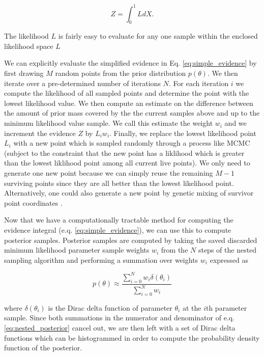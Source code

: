 \begin{equation}
    Z = \int_{0}^{1} L dX. \label{eq:simple_evidence}
\end{equation}

The likelihood $L$ is fairly easy to evaluate for any one sample within the enclosed likelihood space $L$ 

We can explicitly evaluate the simplified evidence in Eq. \ref{eq:simple_evidence} by first drawing $M$ random points from the prior distribution $p(\theta)$. We then iterate over a pre-determined number of iterations $N$. For each iteration $i$ we compute the likelihood of all sampled points and determine the point with the lowest likelihood value. We then compute an estimate on the difference between the amount of prior mass covered by the the current samples above and up to the minimum likelihood value sample. We call this estimate the weight $w_i$ and we increment the evidence $Z$ by $L_i w_i$. Finally, we replace the lowest likelihood point $L_i$ with a new point which is sampled randomly through a process like \ac{MCMC} (subject to the constraint that the 
new point has a liklihood which is greater than the lowest liklihood point among all current live points). We only need to generate one new point because we can simply reuse the remaining $M-1$ surviving points since they are all better than the lowest likelihood point. Alternatively, one could also generate a new point by genetic mixing of survivor point coordinates \cite{skilling2006}.

%
%

Now that we have a computationally tractable method for computing the 
evidence integral (e.q. \ref{eq:simple_evidence}), we can use this 
to compute posterior samples. Posterior samples are computed by 
taking the saved discarded minimum likelihood parameter sample weights $w_i$ from 
the $N$ steps of the nested sampling algorithm and performing 
a summation over weights $w_i$ expressed as

\begin{equation}
    p(\theta) \approx \frac{\sum_{i=0}^{N}w_i\delta( \theta_i)}{\sum_{i=0}^{N} w_i}
    \label{eq:nested_posterior}
\end{equation}

where $\delta(\theta_i)$ is the Dirac delta function of parameter 
$\theta_i$ at the 
$i$th parameter sample. Since both summations in the numerator and 
denominator of e.q. \ref{eq:nested_posterior} cancel out, we are then 
left with a set of Dirac delta functions which can be histogrammed 
in order to compute the probability density function of the posterior.

